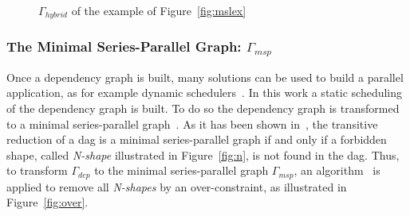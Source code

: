 \begin{figure}[t]
\begin{center}
\caption{$\Gamma_{hybrid}$ of the example of Figure~\ref{fig:mslex}}
\label{fig:hyb}
\end{center}
\end{figure}

\subsubsection*{The Minimal Series-Parallel Graph: $\Gamma_{msp}$}
Once a dependency graph is built, many solutions can be used to build a parallel application, as for example dynamic schedulers~\cite{Augonnet2011,Gautier:2013:XRS:2510661.2511383}. In this work a static scheduling of the dependency graph is built. To do so the dependency graph is transformed to a minimal series-parallel graph~\cite{Valdes:1979:RSP:800135.804393}. As it has been shown in~\cite{Valdes:1979:RSP:800135.804393}, the transitive reduction of a dag is a minimal series-parallel graph if and only if a forbidden shape, called \emph{N-shape} illustrated in Figure~\ref{fig:n}, is not found in the dag. Thus, to transform $\Gamma_{dep}$ to the minimal series-parallel graph $\Gamma_{msp}$, an algorithm~\cite{Mitchell:2004:CMV:1082101.1082117} is applied to remove all \emph{N-shapes} by an over-constraint, as illustrated in Figure~\ref{fig:over}.

